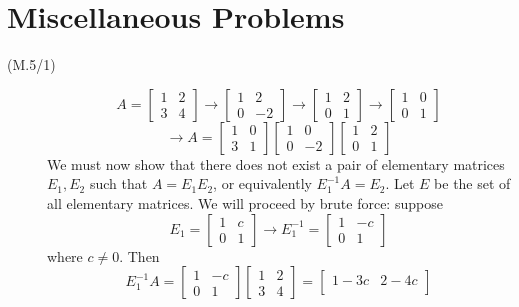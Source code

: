 \documentclass[openany]{book}
\begin{document}
\section*{Miscellaneous Problems}
\begin{description}
\item[(M.5/1)]
$$A = \begin{bmatrix}
1 & 2 \\
3 & 4
\end{bmatrix} \rightarrow \begin{bmatrix}
1 & 2 \\
0 & -2
\end{bmatrix} \rightarrow \begin{bmatrix}
1 & 2 \\
0 & 1
\end{bmatrix} \rightarrow \begin{bmatrix}
1 & 0 \\
0 & 1
\end{bmatrix}$$
$$\rightarrow A = \begin{bmatrix}
1 & 0 \\
3 & 1
\end{bmatrix}\begin{bmatrix}
1 & 0 \\
0 & -2
\end{bmatrix}\begin{bmatrix}
1 & 2 \\
0 & 1
\end{bmatrix}$$
We must now show that there does not exist a pair of elementary matrices $E_1, E_2$ such that $A = E_1E_2$, or equivalently $E_1^{-1}A = E_2$. Let $E$ be the set of all elementary matrices. We will proceed by brute force: suppose 
$$E_1 = \begin{bmatrix}
1 & c \\
0 & 1
\end{bmatrix} \rightarrow E_1^{-1} = \begin{bmatrix}
1 & -c \\
0 & 1
\end{bmatrix}$$
where $c \neq 0$. Then
$$E_1^{-1}A = \begin{bmatrix}
1 & -c \\
0 & 1
\end{bmatrix}\begin{bmatrix}
1 & 2 \\
3 & 4
\end{bmatrix} = \begin{bmatrix}
1 - 3c & 2 - 4c \\

\end{bmatrix}$$
\end{description}
\end{document}
